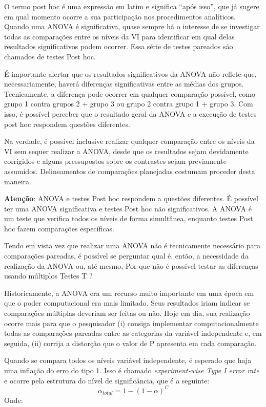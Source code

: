 \documentclass[
]{book}
\begin{document}
O termo post hoc é uma expressão em latim e significa ``após isso'', que já sugere em qual momento ocorre a sua participação nos procedimentos analíticos. Quando uma ANOVA é significativa, quase sempre há o interesse de se investigar todas as comparações entre os níveis da VI para identificar em qual delas resultados significativos podem ocorrer. Essa série de testes pareados são chamados de testes Post hoc.

É importante alertar que os resultados significativos da ANOVA não reflete que, necessariamente, haverá diferenças significativas entre as médias dos grupos. Tecnicamente, a diferença pode ocorrer em qualquer comparação possível, como grupo 1 contra grupos 2 + grupo 3 ou grupo 2 contra grupo 1 + grupo 3. Com isso, é possível perceber que o resultado geral da ANOVA e a execução de testes post hoc respondem questões diferentes.

Na verdade, é possível inclusive realizar qualquer comparação entre os níveis da VI sem sequer realizar a ANOVA, desde que os resultados sejam devidamente corrigidos e alguns pressupostos sobre os contrastes sejam previamente assumidos. Delineamentos de comparações planejadas costumam proceder desta maneira.

\begin{warning}

\textbf{Atenção}: ANOVA e testes Post hoc respondem a questões diferentes. É possível ter uma ANOVA significativa e testes Post hoc não significativos. A ANOVA é um teste que verifica todos os níveis de forma simultânea, enquanto testes Post hoc fazem comparações específicas.

\end{warning}

Tendo em vista vez que realizar uma ANOVA não é tecnicamente necessário para comparações pareadas, é possível se perguntar qual é, então, a necessidade da realização da ANOVA ou, até mesmo, Por que não é possível testar as diferenças usando múltiplos Testes T ?

Historicamente, a ANOVA era um recurso muito importante em uma época em que o poder computacional era mais limitado. Seus resultados iriam indicar se comparações múltiplas deveriam ser feitas ou não. Hoje em dia, sua realização ocorre mais para que o pesquisador (i) consiga implementar computacionalmente todas as comparações pareadas entre as categorias da variável independente e, em seguida, (ii) corrija a distorção que o valor de P apresenta em cada comparação.

Quando se compara todos os níveis variável independente, é esperado que haja uma inflação do erro do tipo 1. Isso é chamado \emph{experiment‑wise Type I error rate} e ocorre pela estrutura do nível de significância, que é a seguinte:
\[\alpha_{total}=1-(1-\alpha)^C\]
Onde:
\end{document}
